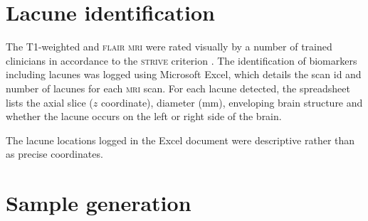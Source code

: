 \section{Lacune identification}\label{data-lacune}

The T1-weighted and \textsc{flair} \textsc{mri} were rated visually by a number of trained clinicians in accordance to the \textsc{strive} criterion \cite{WardlawJ.M.2013Nsfr}. The identification of biomarkers including lacunes was logged using Microsoft Excel, which details the scan id and number of lacunes for each \textsc{mri} scan. For each lacune detected, the spreadsheet lists the axial slice ($z$ coordinate), diameter (mm), enveloping brain structure and whether the lacune occurs on the left or right side of the brain.


The lacune locations logged in the Excel document were descriptive rather than as precise coordinates. 

\section{Sample generation}\label{data-samples}

%
%
%
%

%
%
%
%
%
%
%
%
%

\cite{Yokoyama2007}


